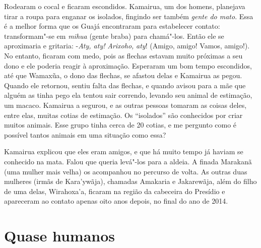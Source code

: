 Rodearam o cocal e ficaram escondidos. Kamairua, um dos homens,
planejava tirar a roupa para enganar os isolados, fingindo ser também
\emph{gente do mato}. Essa é a melhor forma que os Guajá encontraram
para estabelecer contato: transformam"-se em \emph{mihua} (gente braba)
para chamá"-los. Então ele se aproximaria e gritaria: -\emph{Aty, aty!}
\emph{Arixoho,} \emph{aty}! (Amigo, amigo! Vamos, amigo!). No entanto,
ficaram com medo, pois as flechas estavam muito próximas a seu dono e
ele poderia reagir à aproximação. Esperaram um bom tempo escondidos, até
que Wamaxũa, o dono das flechas, se afastou delas e Kamairua as pegou.
Quando ele retornou, sentiu falta das flechas, e quando avisou para a
mãe que alguém as tinha pego ela tentou sair correndo, levando seu
animal de estimação, um macaco. Kamairua a segurou, e as outras pessoas
tomaram as coisas deles, entre elas, muitas cotias de estimação. Os
``isolados'' são conhecidos por criar muitos animais. Esse grupo tinha
cerca de 20 cotias, e me pergunto como é possível tantos animais em uma
situação como essa?

Kamairua explicou que eles eram amigos, e que há muito tempo já haviam
se conhecido na mata. Falou que queria levá"-los para a aldeia. A finada
Marakanã (uma mulher mais velha) os acompanhou no percurso de volta. As
outras duas mulheres (irmãs de Kara'ywãja), chamadas Amakaria e
Jakarewãja, além do filho de uma delas, Wirahoxa'a, ficaram na região da
cabeceira do Presídio e apareceram ao contato apenas oito anos depois,
no final do ano de 2014.

\section{Quase humanos}

